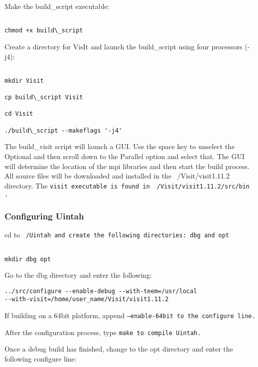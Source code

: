 Make the build\_script executable:

\begin{verbatim}

chmod +x build\_script

\end{verbatim}

Create a directory for VisIt and launch the build\_script using four
processors (-j4):

\begin{verbatim}

mkdir Visit

cp build\_script Visit

cd Visit

./build\_script --makeflags '-j4'

\end{verbatim}

The build\_visit script will launch a GUI.  Use the space key to
unselect the Optional and then scroll down to the Parallel option and
select that.  The GUI will determine the location of the mpi libraries
and then start the build process.  All source files will be downloaded
and installed in the ~/Visit/visit1.11.2 directory.  The \tt visit
\normalfont executable is found in ~/Visit/visit1.11.2/src/bin .

\subsubsection{Configuring Uintah}

cd to \tt ~/Uintah \normalfont and create the following directories:
dbg and opt

\begin{verbatim}

mkdir dbg opt

\end{verbatim}

Go to the dbg directory and enter the following:

\begin{Verbatim}[fontsize=\footnotesize]
../src/configure --enable-debug --with-teem=/usr/local
--with-visit=/home/user_name/Visit/visit1.11.2
\end{Verbatim}

If building on a 64bit platform, append \tt --enable-64bit \normalfont
to the configure line.

After the configuration process, type \tt make \normalfont to compile
Uintah.

Once a debug build has finished, change to the opt directory and enter
the following configure line:

